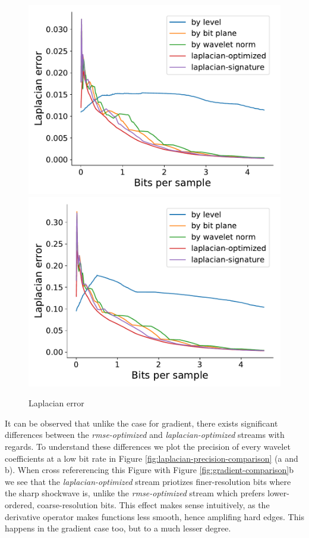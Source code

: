 \begin{figure}
	{\includegraphics[width=0.48\linewidth]{img/laplacian/laplacian-optimized-marschner-lobb.pdf}}
	{\includegraphics[width=0.48\linewidth]{img/laplacian/laplacian-optimized-velocityz.pdf}}
	\caption{Laplacian error}
	\label{fig:gradient-error-comparison}
\end{figure}

It can be observed that unlike the case for gradient, there exists significant differences between
the \emph{rmse-optimized} and \emph{laplacian-optimized} streams with regards. To understand these
differences we plot the precision of every wavelet coefficients at a low bit rate in Figure
\ref{fig:laplacian-precision-comparison} (a and b). When cross refererencing this Figure with Figure
\ref{fig:gradient-comparison}b we see that the \emph{laplacian-optimized} stream priotizes
finer-resolution bits where the sharp shockwave is, unlike the \emph{rmse-optimized} stream which
prefers lower-ordered, coarse-resolution bits. This effect makes sense intuitively, as the
derivative operator makes functions less smooth, hence amplifing hard edges. This happens in the
gradient case too, but to a much lesser degree.

